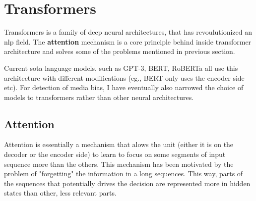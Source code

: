 \section{Transformers}\label{att_transformers}
Transformers is a family of deep neural architectures, that has revoulutionized an \gls{nlp} field. The \textbf{attention} mechanism is a core principle behind inside transformer architecture and solves some of the problems mentioned in previous section.

Current \gls{sota} language models, such as GPT-3, BERT, RoBERTa all use this architecture with different modifications (eg., BERT only uses the encoder side etc). For detection of media bias, I have eventually also narrowed the choice of models to transformers rather than other neural architectures.



\subsection{Attention}
Attention \cite{bahdanau2014neural,luongeffective} is essentially a mechanism that alows the unit (either it is on the decoder or the encoder side) to learn to focus on some segments of input sequence more than the others. This mechanism has been motivated by the problem of "forgetting" the information in a long sequences. This way, parts of the sequences that potentially drives the decision are represented more in hidden states than other, less relevant parts.

